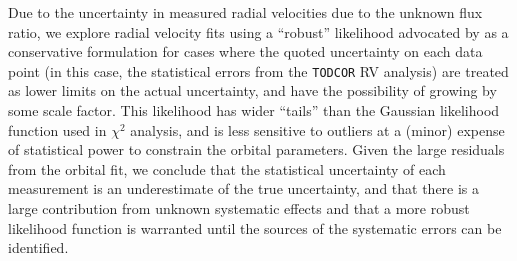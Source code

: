 \documentclass[twocolumn]{aastex61}
\begin{document}
Due to the uncertainty in measured radial velocities due to the unknown flux ratio, we explore radial velocity fits using a ``robust'' likelihood advocated by \citet[Sec. 8.3.1]{sivia06} as a conservative formulation for cases where the quoted uncertainty on each data point (in this case, the statistical errors from the \texttt{TODCOR} RV analysis) are treated as lower limits on the actual uncertainty, and have the possibility of growing by some scale factor. This likelihood has wider ``tails'' than the Gaussian likelihood function used in $\chi^2$ analysis, and is less sensitive to outliers at a (minor) expense of statistical power to constrain the orbital parameters. Given the large residuals from the orbital fit, we conclude that the statistical uncertainty of each measurement is an underestimate of the true uncertainty, and that there is a large contribution from unknown systematic effects and that a more robust likelihood function is warranted until the sources of the systematic errors can be identified.
\end{document}
